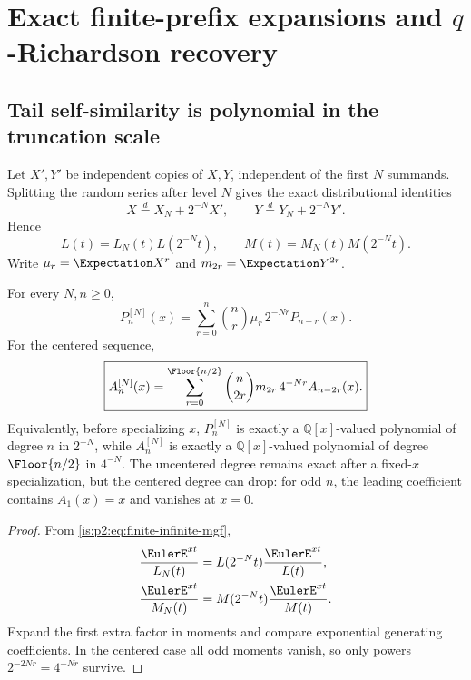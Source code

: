 \section{Exact finite-prefix expansions and \texorpdfstring{$q$}{q}-Richardson recovery}
\label{is:p2:sec:richardson}

\subsection{Tail self-similarity is polynomial in the truncation scale}

Let $X',Y'$ be independent copies of $X,Y$, independent of the first $N$ summands.  Splitting the
random series after level $N$ gives the exact distributional identities
\begin{equation}
 X\overset{d}=X_N+2^{-N}X',
 \qquad
 Y\overset{d}=Y_N+2^{-N}Y'.
 \label{is:p2:eq:tail-self-similarity}
\end{equation}
Hence
\begin{equation}
 L(t)=L_N(t)L(2^{-N}t),
 \qquad
 M(t)=M_N(t)M(2^{-N}t).
 \label{is:p2:eq:finite-infinite-mgf}
\end{equation}
Write $\mu_r=\Expectation X^r$ and $m_{2r}=\Expectation Y^{2r}$.

\begin{theorem}
\label{is:p2:thm:finite-prefix-expansion}
For every $N,n\ge0$,
\begin{equation}
 \boxed{
 P_n^{[N]}(x)
 =\sum_{r=0}^{n}\binom nr\mu_r\,2^{-Nr}P_{n-r}(x).
 }
 \label{is:p2:eq:P-prefix-expansion}
\end{equation}
For the centered sequence,
\begin{equation}
 \boxed{
 A_n^{[N]}(x)
 =\sum_{r=0}^{\Floor{n/2}}
 \binom n{2r}m_{2r}\,4^{-Nr}A_{n-2r}(x).
 }
 \label{is:p2:eq:A-prefix-expansion}
\end{equation}
Equivalently, before specializing \(x\), \(P_n^{[N]}\) is exactly a
\(\mathbb Q[x]\)-valued polynomial of degree \(n\) in \(2^{-N}\), while
\(A_n^{[N]}\) is exactly a \(\mathbb Q[x]\)-valued polynomial of degree
\(\Floor{n/2}\) in \(4^{-N}\).  The uncentered degree remains exact after a
fixed-\(x\) specialization, but the centered degree can drop: for odd \(n\),
the leading coefficient contains \(A_1(x)=x\) and vanishes at \(x=0\).
\end{theorem}

\begin{proof}
From \eqref{is:p2:eq:finite-infinite-mgf},
\begin{align*}
 \frac{\EulerE^{xt}}{L_N(t)}
 &=L(2^{-N}t)\frac{\EulerE^{xt}}{L(t)},\\
 \frac{\EulerE^{xt}}{M_N(t)}
 &=M(2^{-N}t)\frac{\EulerE^{xt}}{M(t)}.
\end{align*}
Expand the first extra factor in moments and compare exponential generating coefficients.  In the
centered case all odd moments vanish, so only powers $2^{-2Nr}=4^{-Nr}$ survive.
\end{proof}

